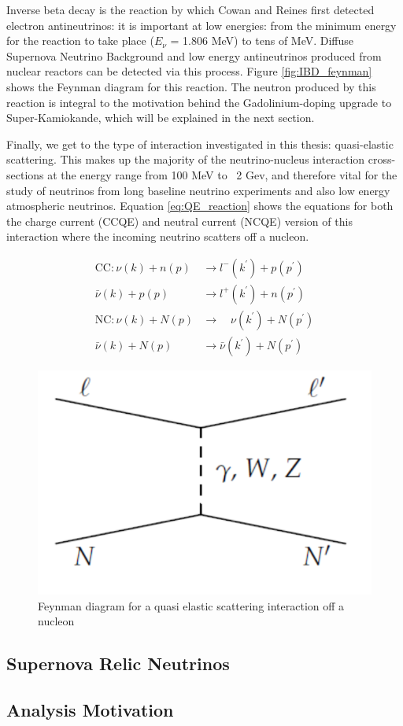 Inverse beta decay is the reaction by which Cowan and Reines first detected electron antineutrinos: it is important at low energies: from the minimum energy for the reaction to take place ($E_{\nu}$ = 1.806 MeV) to tens of MeV. Diffuse Supernova Neutrino Background and low energy antineutrinos produced from nuclear reactors can be detected via this process. Figure \ref{fig:IBD_feynman} shows the Feynman diagram for this reaction. The neutron produced by this reaction is integral to the motivation behind the Gadolinium-doping upgrade to Super-Kamiokande, which will be explained in the next section.

Finally, we get to the type of interaction investigated in this thesis: quasi-elastic scattering. This makes up the majority of the neutrino-nucleus interaction cross-sections at the energy range from 100 MeV to ~2 Gev, and therefore vital for the study of neutrinos from long baseline neutrino experiments and also low energy atmospheric neutrinos. Equation \ref{eq:QE_reaction} shows the equations for both the charge current (CCQE) and neutral current (NCQE) version of this interaction where the incoming neutrino scatters off a nucleon.

$$
\begin{aligned}
\mathrm{CC}: \nu(k)+n(p) & \rightarrow l^{-}\left(k^{\prime}\right)+p\left(p^{\prime}\right) \\
\bar{\nu}(k)+p(p) & \rightarrow l^{+}\left(k^{\prime}\right)+n\left(p^{\prime}\right) \\
\mathrm{NC}: \nu(k)+N(p) & \rightarrow \quad \nu\left(k^{\prime}\right)+N\left(p^{\prime}\right) \\
\bar{\nu}(k)+N(p) & \rightarrow \bar{\nu}\left(k^{\prime}\right)+N\left(p^{\prime}\right)
\end{aligned}
\label{eq:QE_reaction}
$$

\begin{figure}
    \includegraphics[width=\textwidth]{Figures/QE_feynman.png}
    \caption{Feynman diagram for a quasi elastic scattering interaction off a nucleon}
    \label{fig:QE_reaction}
\end{figure}




\subsection{Supernova Relic Neutrinos}

\subsection{Analysis Motivation}




